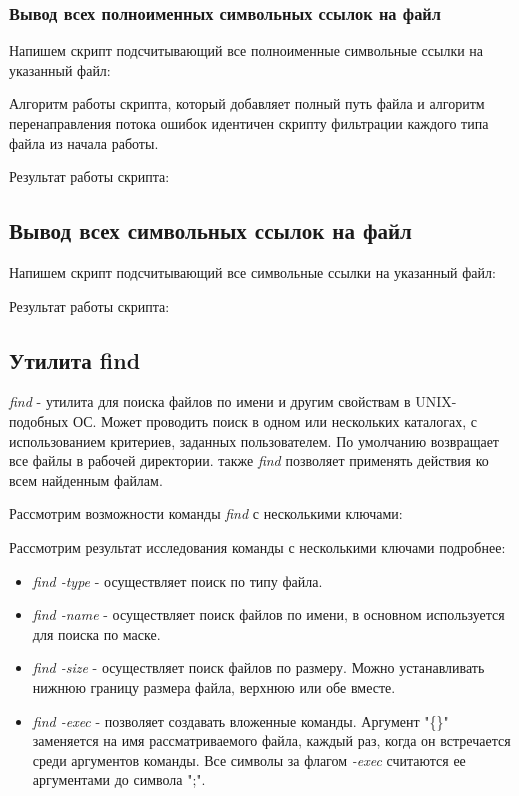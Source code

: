 \documentclass[14pt,a4paper,report]{report}
\begin{document}
\subsubsection{Вывод всех полноименных символьных ссылок на файл}

Напишем скрипт подсчитывающий все полноименные символьные ссылки на указанный файл:



Алгоритм работы скрипта, который добавляет полный путь файла и алгоритм перенаправления потока ошибок идентичен скрипту фильтрации каждого типа файла из начала работы.

Результат работы скрипта:



\subsection{Вывод всех символьных ссылок на файл}

Напишем скрипт подсчитывающий все символьные ссылки на указанный файл:



Результат работы скрипта:



\subsection{Утилита find}

\emph{find} - утилита для поиска файлов по имени и другим свойствам в UNIX-подобных ОС. Может проводить поиск в одном или нескольких каталогах, с использованием критериев, заданных пользователем. По умолчанию возвращает все файлы в рабочей директории. также \emph{find} позволяет применять действия ко всем найденным файлам.

Рассмотрим возможности команды \emph{find} с несколькими ключами:



Рассмотрим результат исследования команды с несколькими ключами подробнее:

\begin{itemize}
	\item \emph{find -type} - осуществляет поиск по типу файла.
	\item \emph{find -name} - осуществляет поиск файлов по имени, в основном используется для поиска по маске.
	\item \emph{find -size} - осуществляет поиск файлов по размеру. Можно устанавливать нижнюю границу размера файла, верхнюю или обе вместе.
	\item \emph{find -exec} - позволяет создавать вложенные команды. Аргумент "\{\}" заменяется на имя рассматриваемого файла, каждый раз, когда он встречается среди аргументов команды. Все символы за флагом \emph{-exec} считаются ее аргументами до символа ";".
\end{itemize}
\end{document}
